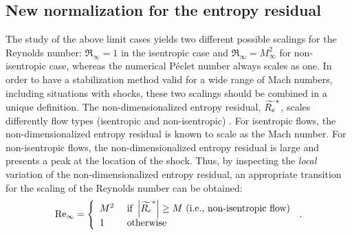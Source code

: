 \subsection{New normalization for the entropy residual} \label{sec:new_normaliz}

The study of the above limit cases yields two different possible scalings for the Reynolds number: $\Re_\infty = 1$ in the isentropic case and $\Re_\infty  = M_\infty^2$ for non-isentropic case, whereas the numerical P\'eclet number always scales as one. In order to have a stabilization method valid for a wide range of Mach numbers, including situations with shocks, these two scalings should be combined in a unique definition. The non-dimensionalized entropy residual, $\widetilde{R_e}^*$, scales differently flow types (isentropic and non-isentropic) \cite{alazard}. For isentropic flows, the non-dimensionalized entropy residual is known to scale as the Mach number. For non-isentropic flows, the non-dimensionalized entropy residual is large and presents a peak at the location of the shock. Thus, by inspecting the  \emph{local} variation of the non-dimensionalized entropy residual, an appropriate transition for the scaling of the Reynolds number can be obtained:
\begin{equation}  
\label{eq:norm_ent}
\textrm{Re}_\infty =  \left\{
\begin{array}{ll}
M^2  & \text{ if } \left| \widetilde{R_e}^* \right| \geq M \text{ (i.e., non-isentropic flow)} \\
1    & \text{ otherwise}
\end{array}
\right.
\, .
\end{equation}

